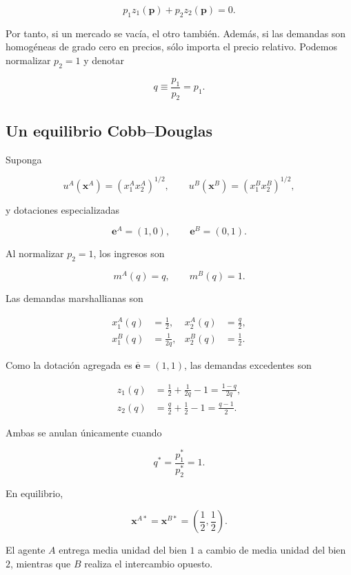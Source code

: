 \documentclass[12pt]{article}
\theoremstyle{cideplain}
\theoremstyle{cidedef}
\newcommand{\p}{\bm p}
\newcommand{\e}{\bm e}
\newcommand{\x}{\bm x}
\begin{document}
\[
  p_1z_1(\p)+p_2z_2(\p)=0.
\]

Por tanto, si un mercado se vacía, el otro también. Además, si las demandas son homogéneas
de grado cero en precios, sólo importa el precio relativo. Podemos normalizar \(p_2=1\) y
denotar

\[
  q\equiv\frac{p_1}{p_2}=p_1.
\]

\subsection{Un equilibrio Cobb--Douglas}

Suponga

\[
  u^A(\x^A)=(x_1^Ax_2^A)^{1/2},
  \qquad
  u^B(\x^B)=(x_1^Bx_2^B)^{1/2},
\]

y dotaciones especializadas

\[
  \e^A=(1,0),
  \qquad
  \e^B=(0,1).
\]

Al normalizar \(p_2=1\), los ingresos son

\[
  m^A(q)=q,
  \qquad
  m^B(q)=1.
\]

Las demandas marshallianas son

\begin{align}
  x_1^A(q)&=\frac12,
  &x_2^A(q)&=\frac q2,
  \label{eq:demands-a-two}\\
  x_1^B(q)&=\frac{1}{2q},
  &x_2^B(q)&=\frac12.
  \label{eq:demands-b-two}
\end{align}

Como la dotación agregada es \(\overline{\e}=(1,1)\), las demandas excedentes son

\begin{align}
  z_1(q)
  &=
  \frac12+\frac{1}{2q}-1
  =
  \frac{1-q}{2q},
  \label{eq:z1-two}\\
  z_2(q)
  &=
  \frac q2+\frac12-1
  =
  \frac{q-1}{2}.
  \label{eq:z2-two}
\end{align}

Ambas se anulan únicamente cuando

\begin{equation}
  q^*=\frac{p_1^*}{p_2^*}=1.
  \label{eq:qstar-two}
\end{equation}

En equilibrio,

\[
  \x^{A*}=\x^{B*}
  =
  \left(\frac12,\frac12\right).
\]

El agente \(A\) entrega media unidad del bien \(1\) a cambio de media unidad del bien \(2\),
mientras que \(B\) realiza el intercambio opuesto.
\end{document}
